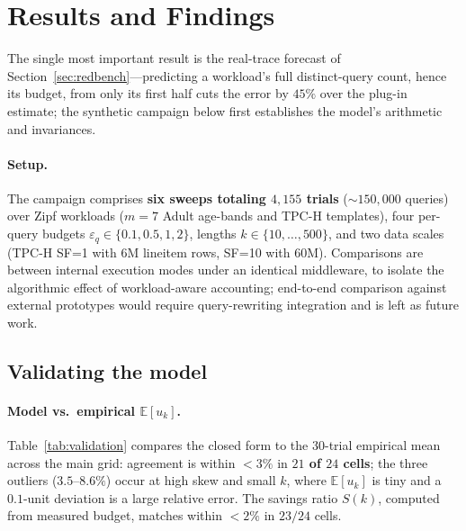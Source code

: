 \documentclass[sigconf,nonacm]{acmart}
\newcommand{\eps}{\varepsilon}
\newcommand{\E}{\mathbb{E}}
\begin{document}
\section{Results and Findings}
\label{sec:results}

\noindent The single most important result is the real-trace forecast of Section~\ref{sec:redbench}---predicting a workload's full distinct-query count, hence its budget, from only its first half cuts the error by $45\%$ over the plug-in estimate; the synthetic campaign below first establishes the model's arithmetic and invariances.

\paragraph{Setup.}
The campaign comprises \textbf{six sweeps totaling $4{,}155$ trials} ($\sim$$150{,}000$ queries) over Zipf workloads ($m{=}7$ Adult age-bands and TPC-H templates), four per-query budgets $\eps_q\in\{0.1,0.5,1,2\}$, lengths $k\in\{10,\dots,500\}$, and two data scales (TPC-H SF=1 with 6M lineitem rows, SF=10 with 60M). Comparisons are between internal execution modes under an identical middleware, to isolate the algorithmic effect of workload-aware accounting; end-to-end comparison against external prototypes would require query-rewriting integration and is left as future work.

\subsection{Validating the model}

\paragraph{Model vs.\ empirical $\E[u_k]$.}
Table~\ref{tab:validation} compares the closed form to the 30-trial empirical mean across the main grid: agreement is within $<3\%$ in \textbf{$21$ of $24$ cells}; the three outliers ($3.5$--$8.6\%$) occur at high skew and small $k$, where $\E[u_k]$ is tiny and a $0.1$-unit deviation is a large relative error. The savings ratio $S(k)$, computed from measured budget, matches within $<2\%$ in $23/24$ cells.
\end{document}
